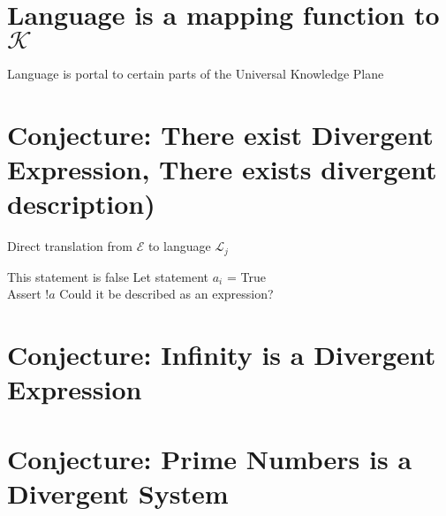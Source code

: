 \documentclass[11pt]{article}
\begin{document}
\section{Language is a mapping function to $\mathcal{K}$}
Language is portal to certain parts of the Universal Knowledge Plane 







\section{Conjecture: There exist Divergent Expression, There exists divergent description)}

Direct translation from $\mathcal{E}$ to language $\mathcal{L}_j$

This statement is false 
Let statement $a_i$ = True\\
Assert !$a$
Could it be described as an expression?







\section{Conjecture: Infinity is a Divergent Expression}





\section{Conjecture: Prime Numbers is a Divergent System}
\end{document}
